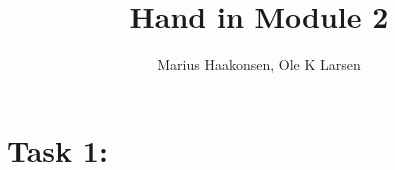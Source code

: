 \documentclass[11pt]{amsart}
\title{Hand in Module 2}
\author{Marius Haakonsen, Ole K Larsen}
\begin{document}
	
	\maketitle
	
	\section{Task 1:}
	
\end{document}
